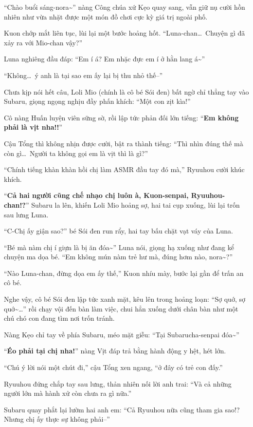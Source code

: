 \documentclass[../main.tex]{subfiles}
\begin{document}
``Chào buổi sáng-nora\~{}'' nàng Công chúa xứ Kẹo quay sang, vẫn giữ nụ cười hồn nhiên như vừa nhặt được một món đồ chơi cực kỳ giá trị ngoài phố.

Kuon chớp mắt liên tục, lùi lại một bước hoảng hốt. ``Luna-chan\dots\ Chuyện gì đã xảy ra với Mio-chan vậy?''

Luna nghiêng đầu đáp: ``Em í á? Em nhặc đực em í ở hằn lang á\~{}''

``Không\dots\ ý anh là tại sao em ấy lại bị thu nhỏ thế--''

Chưa kịp nói hết câu, Loli Mio (chính là cô bé Sói đen) bất ngờ chỉ thẳng tay vào Subaru, giọng ngọng nghịu đầy phấn khích: ``Một con zịt kìa!''

Cô nàng Huấn luyện viên sững sờ, rồi lập tức phản đối lớn tiếng: ``\textbf{Em không phải là vịt nha!!}''

Cậu Tổng thì không nhịn được cười, bật ra thành tiếng: ``Thì nhìn đúng thế mà còn gì\dots\ Người ta không gọi em là vịt thì là gì?''

``Chính tiếng khàn khàn hồi chị làm ASMR đầu tay đó mà,'' Ryuuhou cười khúc khích.

``\textbf{Cả hai người cũng chế nhạo chị luôn à, Kuon-senpai, Ryuuhou-chan!?}'' Subaru la lên, khiến Loli Mio hoảng sợ, hai tai cụp xuống, lùi lại trốn sau lưng Luna.

``C-Chị ấy giận sao?'' bé Sói đen run rẩy, hai tay bấu chặt vạt váy của Luna.

``Bé mà nàm chị í giựn là bị ăn đóa\~{}'' Luna nói, giọng hạ xuống như đang kể chuyện ma dọa bé. ``Em không mún nàm trẻ hư mà, đúng hơm nào, nora\~{}?''

``Nào Luna-chan, đừng dọa em ấy thế,'' Kuon nhíu mày, bước lại gần để trấn an cô bé.

Nghe vậy, cô bé Sói đen lập tức xanh mặt, kêu lên trong hoảng loạn: ``Sợ quớ, sợ quớ\~{}\dots'' rồi chạy vội đến bàn làm việc, chui hẳn xuống dưới chân bàn như một chú chó con đang tìm nơi trốn tránh.

Nàng Kẹo chỉ tay về phía Subaru, méo mặt giễu: ``Tại Subarucha-senpai đóa\~{}''

``\textbf{Éo phải tại chị nha!}'' nàng Vịt đáp trả bằng hành động y hệt, hét lớn.

``Chú ý lời nói một chút đi,'' cậu Tổng xen ngang, ``ở đây có trẻ con đấy.''

Ryuuhou đứng chắp tay sau lưng, thản nhiên nối lời anh trai: ``Và cả những người lớn mà hành xử còn chưa ra gì nữa.''

Subaru quay phắt lại lườm hai anh em: ``Cả Ryuuhou nữa cũng tham gia sao!? Nhưng chị ấy thực sự không phải--''
\end{document}
